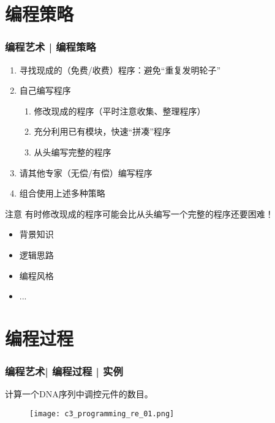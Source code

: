\section{编程策略}
\begin{frame}
  \frametitle{编程艺术 | \alert{编程策略}}
  \begin{enumerate}
    \item 寻找现成的（免费/收费）程序：避免“重复发明轮子”
    \item 自己编写程序
      \begin{enumerate}
	\item 修改现成的程序（平时注意收集、整理程序）
	\item 充分利用已有模块，快速“拼凑”程序
	\item 从头编写完整的程序
      \end{enumerate}
    \item 请其他专家（无偿/有偿）编写程序
    \item 组合使用上述多种策略
  \end{enumerate}
  \pause
  \begin{block}{注意}
    有时修改现成的程序可能会比从头编写一个完整的程序还要困难！
    \begin{itemize}
      \item 背景知识
      \item 逻辑思路
      \item 编程风格
      \item ...
    \end{itemize}
  \end{block}
\end{frame}

\section{编程过程}
\begin{frame}
  \frametitle{编程艺术| 编程过程 | 实例}
  \begin{center}
    {\Large 计算一个DNA序列中调控元件的数目。}
  \end{center}
  \begin{figure}
    \centering
    \texttt{[image: c3\_programming\_re\_01.png]}
  \end{figure}
\end{frame}

